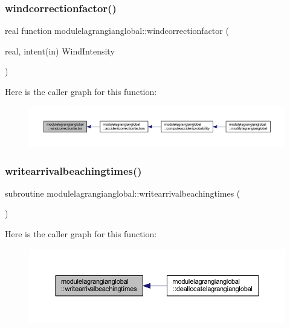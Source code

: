 \subsubsection{\texorpdfstring{windcorrectionfactor()}{windcorrectionfactor()}}
{\footnotesize\ttfamily real function modulelagrangianglobal\+::windcorrectionfactor (\begin{DoxyParamCaption}\item[{real, intent(in)}]{Wind\+Intensity }\end{DoxyParamCaption})\hspace{0.3cm}{\ttfamily [private]}}

Here is the caller graph for this function\+:\nopagebreak
\begin{figure}[H]
\begin{center}
\leavevmode
\includegraphics[width=350pt]{namespacemodulelagrangianglobal_a69e5b3c9a0aabddfcaaf7e1b76623286_icgraph}
\end{center}
\end{figure}
\mbox{\label{namespacemodulelagrangianglobal_abe2b20a8a7925f8d626cdc676a372c07}} 
\subsubsection{\texorpdfstring{writearrivalbeachingtimes()}{writearrivalbeachingtimes()}}
{\footnotesize\ttfamily subroutine modulelagrangianglobal\+::writearrivalbeachingtimes (\begin{DoxyParamCaption}{ }\end{DoxyParamCaption})\hspace{0.3cm}{\ttfamily [private]}}

Here is the caller graph for this function\+:\nopagebreak
\begin{figure}[H]
\begin{center}
\leavevmode
\includegraphics[width=350pt]{namespacemodulelagrangianglobal_abe2b20a8a7925f8d626cdc676a372c07_icgraph}
\end{center}
\end{figure}
\mbox{\label{namespacemodulelagrangianglobal_ab5538aa3df9f78e442a96f940f3d160f}} 
